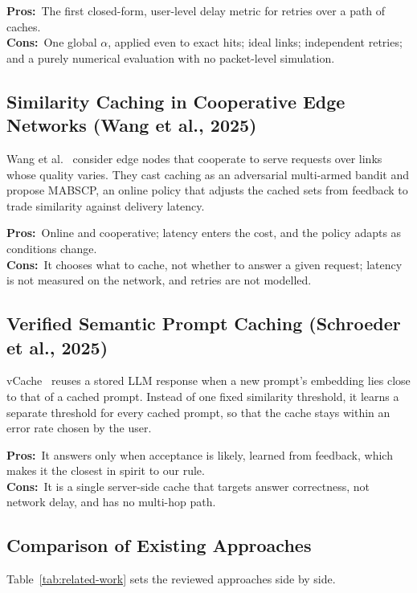 \documentclass[11pt,a4paper]{article}
\newcommand{\pros}{\textcolor{green!50!black}{\textbf{Pros:}}~}
\newcommand{\cons}{\textcolor{red!70!black}{\textbf{Cons:}}~}
\begin{document}
\pros The first closed-form, user-level delay metric for retries over a path of caches.\\
\cons One global $\alpha$, applied even to exact hits; ideal links; independent retries; and a purely
numerical evaluation with no packet-level simulation.

\subsection{Similarity Caching in Cooperative Edge Networks (Wang et al., 2025)}
Wang et al.~\cite{wang2025bandit} consider edge nodes that cooperate to serve requests over links
whose quality varies. They cast caching as an adversarial multi-armed bandit and propose MABSCP, an
online policy that adjusts the cached sets from feedback to trade similarity against delivery
latency.

\pros Online and cooperative; latency enters the cost, and the policy adapts as conditions change.\\
\cons It chooses what to cache, not whether to answer a given request; latency is not measured on the
network, and retries are not modelled.

\subsection{Verified Semantic Prompt Caching (Schroeder et al., 2025)}
vCache~\cite{schroeder2025vcache} reuses a stored LLM response when a new prompt's embedding lies
close to that of a cached prompt. Instead of one fixed similarity threshold, it learns a separate
threshold for every cached prompt, so that the cache stays within an error rate chosen by the user.

\pros It answers only when acceptance is likely, learned from feedback, which makes it the closest in
spirit to our rule.\\
\cons It is a single server-side cache that targets answer correctness, not network delay, and has no
multi-hop path.

\subsection{Comparison of Existing Approaches}\label{sec:lit-compare}
Table~\ref{tab:related-work} sets the reviewed approaches side by side.
\end{document}

